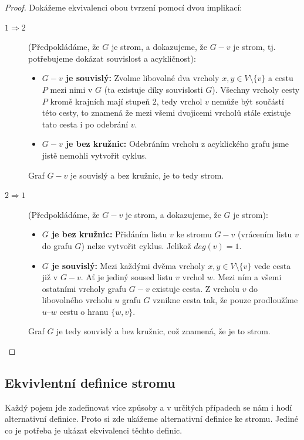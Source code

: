 \begin{proof}
Dokážeme ekvivalenci obou tvrzení pomocí dvou implikací:
\begin{description}
    \item[$1 \Rightarrow 2$] (Předpokládáme, že $G$ je strom, a dokazujeme, že $G - v$ je strom, tj. potřebujeme dokázat souvislost a acykličnost):
    \begin{itemize}
        \item \textbf{$G - v$ je souvislý:} Zvolme libovolné dva vrcholy $x, y \in V \setminus \{v\}$ a cestu $P$ mezi nimi v $G$ (ta existuje díky souvislosti $G$). Všechny vrcholy cesty $P$ kromě krajních mají stupeň $2$, tedy vrchol $v$ nemůže být součástí této cesty, to znamená že mezi všemi dvojicemi vrcholů stále existuje tato cesta i po odebrání $v$.

        \item \textbf{$G - v$ je bez kružnic:} Odebráním vrcholu z acyklického grafu jsme jistě nemohli vytvořit cyklus. 
    \end{itemize}
    Graf $G - v$ je souvislý a bez kružnic, je to tedy strom.
    
    \item[$2 \Rightarrow 1$] (Předpokládáme, že $G - v$ je strom, a dokazujeme, že $G$ je strom):
    \begin{itemize}
        \item \textbf{$G$ je bez kružnic:} Přidáním listu $v$ ke stromu $G - v$ (vrácením listu $v$ do grafu $G$) nelze vytvořit cyklus. Jelikož $deg(v) = 1$.

        \item \textbf{$G$ je souvislý:} Mezi každými dvěma vrcholy $x, y \in V \setminus \{v\}$ vede cesta již v $G - v$. Ať je jediný soused listu $v$ vrchol $w$. Mezi ním a všemi ostatními vrcholy grafu $G-v$ existuje cesta. Z vrcholu $v$ do libovolného vrcholu $u$ grafu $G$ vznikne cesta tak, že pouze prodloužíme $u\text{--}w$ cestu o hranu $\{w,v\}$.
    \end{itemize}
    Graf $G$ je tedy souvislý a bez kružnic, což znamená, že je to strom.
\end{description}
\end{proof}

\subsection{Ekvivlentní definice stromu}

\noindent Každý pojem jde zadefinovat více způsoby a v určitých případech se nám i hodí alternativní definice. Proto si zde ukážeme alternativní definice ke stromu. Jediné co je potřeba je ukázat ekvivalenci těchto definic.

